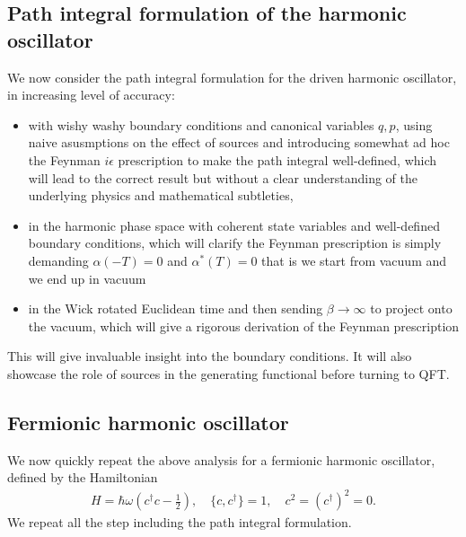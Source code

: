 \documentclass[../QFT_main.tex]{subfiles}
\begin{document}
\subsection[Path integral formulation of the harmonic oscillator]{Path integral formulation of the harmonic oscillator}
%
We now consider the path integral formulation for the driven harmonic oscillator, in increasing level of accuracy:
\begin{itemize}
    \item with wishy washy boundary conditions and canonical variables $q,p$, using naive asusmptions on the effect of sources and introducing somewhat ad hoc the Feynman $i\epsilon$ prescription to make the path integral well-defined, which will lead to the correct result but without a clear understanding of the underlying physics and mathematical subtleties,
    \item in the harmonic phase space with coherent state variables and well-defined boundary conditions, which will clarify the Feynman prescription is simply demanding $\alpha(-T)=0$ and $\alpha^*(T)=0$ that is we start from vacuum and we end up in vacuum
    \item in the Wick rotated Euclidean time and then sending $\beta\to\infty$ to project onto the vacuum, which will give a rigorous derivation of the Feynman prescription 
\end{itemize}
This will give invaluable insight into the boundary conditions.
It will also showcase the role of sources in the generating functional before turning to QFT.





\subsection{Fermionic harmonic oscillator}
%
We now quickly repeat the above analysis for a fermionic harmonic oscillator, defined by the Hamiltonian
\begin{align}
    H = \hbar \omega \left(c^\dagger c - \tfrac{1}{2}\right), \quad \{c, c^\dagger\} = 1, \quad c^2 = (c^\dagger)^2 = 0.
\end{align}
We repeat all the step including the path integral formulation.
\end{document}
